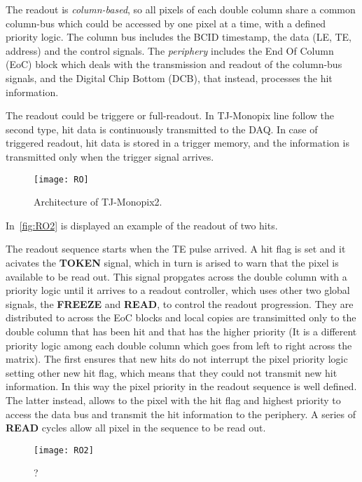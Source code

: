 The readout is \textit{column-based}, so all pixels of each double column share a common column-bus which could be accessed by one pixel at a time, with a defined priority logic. The column bus includes the BCID timestamp, the data (LE, TE, address) and the control signals.
The \textit{periphery} includes the End Of Column (EoC) block which deals with the transmission and readout of the column-bus signals, and the Digital Chip Bottom (DCB), that instead, processes the hit information. 

The readout could be triggere or full-readout. In TJ-Monopix line follow the second type, hit data is continuously transmitted to the DAQ. In case of triggered readout, hit data is stored in a trigger memory, and the information is transmitted only when the trigger signal arrives.

\begin{figure}[h!]
\centering
\texttt{[image: RO]}
\caption{Architecture of TJ-Monopix2.}
\label{fig:RO}
\end{figure}

In~\autoref{fig:RO2} is displayed an example of the readout of two hits. 

The readout sequence starts when the TE pulse arrived. A hit flag is set and it acivates the \textsc{\textbf{TOKEN}} signal, which in turn is arised to warn that the pixel is available to be read out. This signal propgates across the double column with a priority logic until it arrives to a readout controller, which uses other two global signals, the \textsc{\textbf{FREEZE}} and \textsc{\textbf{READ}}, to control the readout progression. They are distributed to across the EoC blocks and local copies are transimitted only to the double column that has been hit and that has the higher priority (It is a different priority logic among each double column which goes from left to right across the matrix).
The first ensures that new hits do not interrupt the pixel priority logic setting other new hit flag, which means that they could not transmit new hit information. In this way the pixel priority in the readout sequence is well defined. The latter instead, allows to the pixel with the hit flag and highest priority to access the data bus and transmit the hit information to the periphery. A series of \textsc{\textbf{READ}} cycles allow all pixel in the sequence to be read out.

\begin{figure}[h!]
\centering
\texttt{[image: RO2]}
\caption{?}
\label{fig:RO2}
\end{figure}













